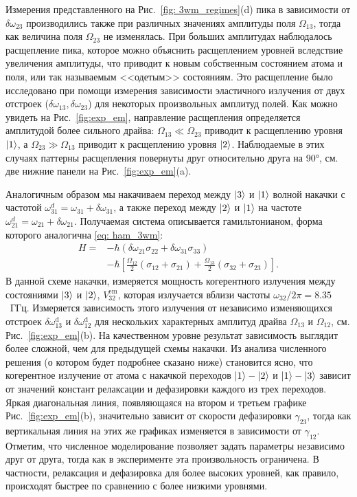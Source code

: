 Измерения представленного на Рис.~\ref{fig: 3wm_regimes}(d) пика в зависимости от $\delta\omega_{23}$ производились также при различных значениях амплитуды поля $\Omega_{13}$, тогда как величина поля $\Omega_{23}$ не изменялась. При больших амплитудах наблюдалось расщепление пика, которое можно объяснить расщеплением уровней вследствие увеличения амплитуды, что приводит к новым собственным состоянием атома и поля, или так называемым <<одетым>> состояниям. Это расщепление было исследовано при помощи измерения зависимости эластичного излучения от двух отстроек ($\delta\omega_{13}, \delta\omega_{23}$) для некоторых произвольных амплитуд полей. Как можно увидеть на Рис.~\ref{fig:exp_em}, направление расщепления определяется амплитудой более сильного драйва: $\Omega_{13}\ll\Omega_{23}$ приводит к расщеплению уровня $\ket{1}$, а $\Omega_{23}\gg\Omega_{13}$ приводит к расщеплению уровня $\ket{2}$. Наблюдаемые в этих случаях паттерны расщепления повернуты друг относительно друга на \ang{90}, см. две нижние панели на Рис.~\ref{fig:exp_em}(a).

Аналогичным образом мы накачиваем переход между $\ket{3}$ и $\ket{1}$ волной накачки с частотой $\omega_{31}^{d}=\omega_{31}+\delta\omega_{31}$, а также переход между $
\ket{2}$ и $\ket{1}$ на частоте $\omega_{21}^{d}=\omega_{21}+\delta\omega_{21}$. Получаемая система описывается гамильтонианом, форма которого аналогична \eqref{eq: ham_3wm}:
\begin{equation}
	\begin{aligned}
		H={}&-\hbar(\delta\omega_{21}\sigma_{22}+\delta\omega_{31}\sigma_{33})\\
		&-\hbar\left[\frac{\Omega_{12}}{2}(\sigma_{12}+\sigma_{21})+\frac{\Omega_{13}}{2}(\sigma_{32}+\sigma_{23})\right].
	\end{aligned}
\label{H2}
\end{equation}
В данной схеме накачки, измеряется мощность когерентного излучения между состояниями $\ket{3}$ и $\ket{2}$, $V_{32}^{\text{em}}$, которая излучается вблизи частоты $\omega_{32}/2\pi=8.35$~ГГц. Измеряется зависимость этого излучения от независимо изменяющихся отстроек $\delta\omega^{\text{d}}_{13}$ и $\delta\omega^{\text{d}}_{12}$ для нескольких характерных амплитуд драйва $\Omega_13$ и $\Omega_{12}$, см. Рис.~\ref{fig:exp_em}(b). На качественном уровне результат зависимость выглядит более сложной, чем для предыдущей схемы накачки. Из анализа численного решения (о котором будет подробнее сказано ниже) становится ясно, что когерентное излучение от атома с накачкой переходов $\ket{1}-\ket{2}$ и $\ket{1}-\ket{3}$ зависит от значений констант релаксации и дефазировки каждого из трех переходов. Яркая диагональная линия, появляющаяся на втором и третьем графике Рис.~\ref{fig:exp_em}(b), значительно зависит от скорости дефазировки $\gamma_{23}$, тогда как вертикальная линия на этих же графиках изменяется в зависимости от $\gamma_{12}$. Отметим, что численное моделирование позволяет задать параметры независимо друг от друга, тогда как в эксперименте эта произвольность ограничена. В частности, релаксация и дефазировка для более высоких уровней, как правило, происходят быстрее по сравнению с более низкими уровнями. 

